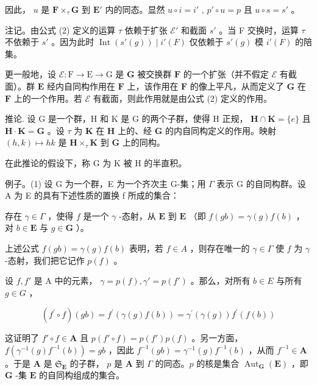 因此， \(u\) 是 \(\mathbf{F} \times_{\tau} \mathbf{G}\) 到 \(\mathbf{E}'\) 内的同态。显然 \(u \circ i = i'\) , \(p' \circ u = p\) 且 \(u \circ s = s'\) 。

注记。由公式 (2) 定义的运算 \(\tau\) 依赖于扩张 \(\mathcal{E}'\) 和截面 \(s'\) 。当 F 交换时，运算 \(\tau\) 不依赖于 \(s'\) 。因为此时 \(\operatorname{Int}(s'(g)) \mid i'(F)\) 仅依赖于 \(s'(g)\) 模 \(i'(F)\) 的陪集。

更一般地，设 \(\mathcal{E}:\mathrm{F}\to \mathrm{E}\to \mathrm{G}\) 是 \(\mathbf{G}\) 被交换群 \(\mathbf{F}\) 的一个扩张（并不假定 \(\mathcal{E}\) 有截面）。群 \(\mathbf{E}\) 经内自同构作用在 \(\mathbf{F}\) 上，该作用在 \(\mathbf{F}\) 的像上平凡，从而定义了 \(\mathbf{G}\) 在 \(\mathbf{F}\) 上的一个作用。若 \(\mathcal{E}\) 有截面，则此作用就是由公式 (2) 定义的作用。

推论. 设 G 是一个群，H 和 K 是 G 的两个子群，使得 H 正规， \(\mathbf{H} \cap \mathbf{K} = \{e\}\) 且 \(\mathbf{H} \cdot \mathbf{K} = \mathbf{G}\) 。设 \(\tau\) 为 \(\mathbf{K}\) 在 \(\mathbf{H}\) 上的、经 \(\mathbf{G}\) 的内自同构定义的作用。映射 \((h, k) \mapsto hk\) 是 \(\mathbf{H} \times_{\tau} \mathbf{K}\) 到 \(\mathbf{G}\) 上的同构。

在此推论的假设下，称 G 为 K 被 H 的半直积。

例子。(1) 设 G 为一个群，E 为一个齐次主 G-集；用 \(\Gamma\) 表示 G 的自同构群。设 A 为 E 的具有下述性质的置换 f 所成的集合：

存在 \(\gamma \in \Gamma\) ，使得 \(f\) 是一个 \(\gamma\) -态射，从 \(\mathbf{E}\) 到 \(\mathbf{E}\) （即 \(f(gb) = \gamma(g)f(b)\) ，对 \(b \in \mathbf{E}\) 与 \(g \in \mathbf{G}\) ）。

上述公式 \(f(gb) = \gamma(g)f(b)\) 表明，若 \(f \in A\) ，则存在唯一的 \(\gamma \in \Gamma\) 使 \(f\) 为 \(\gamma\) -态射，我们把它记作 \(p(f)\) 。

设 \(f, f'\) 是 A 中的元素， \(\gamma = p(f), \gamma' = p(f')\) 。那么，对所有 \(b \in E\) 与所有 \(g \in G\) ，

\[
(f ^ {\prime} \circ f) (g b) = f ^ {\prime} (\gamma (g) f (b)) = \gamma^ {\prime} (\gamma (g)) f ^ {\prime} (f (b))
\]

这证明了 \(f' \circ f \in \mathbf{A}\) 且 \(p(f' \circ f) = p(f')p(f)\) 。另一方面， \(f(\gamma^{-1}(g)f^{-1}(b)) = gb\) ，因此 \(f^{-1}(gb) = \gamma^{-1}(g)f^{-1}(b)\) ，从而 \(f^{-1} \in \mathbf{A}\) 。于是 \(\mathbf{A}\) 是 \(\mathfrak{S}_{\mathbf{E}}\) 的子群， \(p\) 是 \(\mathbf{A}\) 到 \(\Gamma\) 的同态。\(p\) 的核是集合 \(\operatorname{Aut}_{\mathbf{G}}(\mathbf{E})\) ，即 \(\mathbf{G}\) -集 \(\mathbf{E}\) 的自同构组成的集合。

